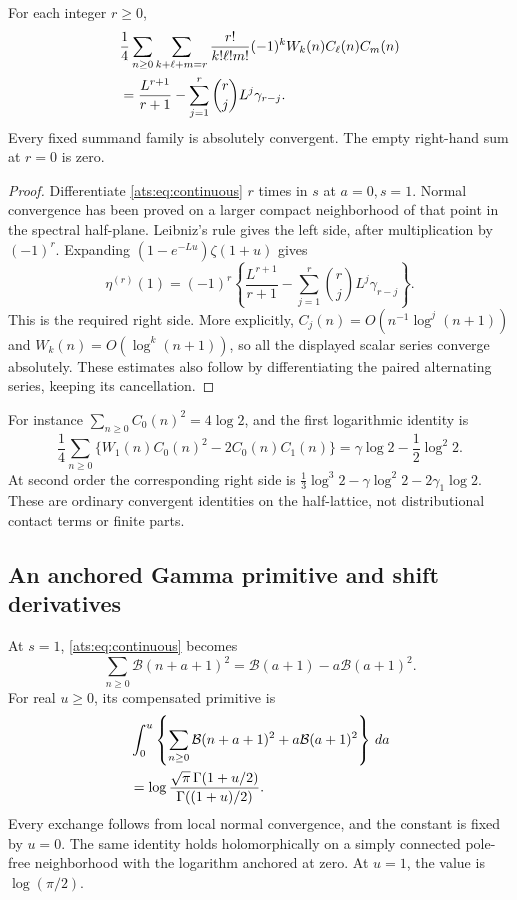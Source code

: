 \begin{corollary}
\label{ats:cor:stieltjes}
For each integer $r\ge0$,
\begin{align}\label{ats:eq:stieltjes}
 &\frac14\sum_{n\ge0}
  \sum_{k+\ell+m=r}\frac{r!}{k!\ell!m!}
                 (-1)^k W_k(n)C_\ell(n)C_m(n)\notag\\
 &=\frac{L^{r+1}}{r+1}
          -\sum_{j=1}^{r}\binom rj L^j\gamma_{r-j}.
\end{align}
Every fixed summand family is absolutely convergent. The empty
right-hand sum at $r=0$ is zero.
\end{corollary}

\begin{proof}
Differentiate \eqref{ats:eq:continuous} $r$ times in $s$ at $a=0,s=1$.
Normal convergence has been proved on a larger compact neighborhood
of that point in the spectral half-plane. Leibniz's rule gives the
left side, after multiplication by $(-1)^r$.
Expanding $(1-e^{-Lu})\zeta(1+u)$ gives
\[
 \eta^{(r)}(1)=(-1)^r\left\{
  \frac{L^{r+1}}{r+1}
   -\sum_{j=1}^{r}\binom rj L^j\gamma_{r-j}\right\}.
\]
This is the required right side. More explicitly,
$C_j(n)=O(n^{-1}\log^j(n+1))$ and
$W_k(n)=O(\log^k(n+1))$, so all the displayed scalar series
converge absolutely. These estimates also follow by differentiating
the paired alternating series, keeping its cancellation.
\end{proof}

For instance $\sum_{n\ge0}C_0(n)^2=4\log2$, and the first
logarithmic identity is
\[
 \frac14\sum_{n\ge0}
  \{W_1(n)C_0(n)^2-2C_0(n)C_1(n)\}
 =\gamma\log2-\frac12\log^2 2.
\]
At second order the corresponding right side is
$\tfrac13\log^3 2-\gamma\log^2 2-2\gamma_1\log2$.
These are ordinary convergent identities on the half-lattice, not
distributional contact terms or finite parts.

\subsection{An anchored Gamma primitive and shift derivatives}

At $s=1$, \eqref{ats:eq:continuous} becomes
\begin{equation}\label{ats:eq:nielsen-square}
 \sum_{n\ge0}\mathcal B(n+a+1)^2
       =\mathcal B(a+1)-a\mathcal B(a+1)^2.
\end{equation}
For real $u\ge0$, its compensated primitive is
\begin{align}\label{ats:eq:gamma-primitive}
 &\int_0^u\left\{\sum_{n\ge0}\mathcal B(n+a+1)^2
                   +a\mathcal B(a+1)^2\right\}\,da\notag\\
 &=\log\frac{\sqrt\pi\,\Gamma(1+u/2)}{\Gamma((1+u)/2)}.
\end{align}
Every exchange follows from local normal convergence, and the
constant is fixed by $u=0$. The same identity holds holomorphically
on a simply connected pole-free neighborhood with the logarithm
anchored at zero. At $u=1$, the value is $\log(\pi/2)$.

